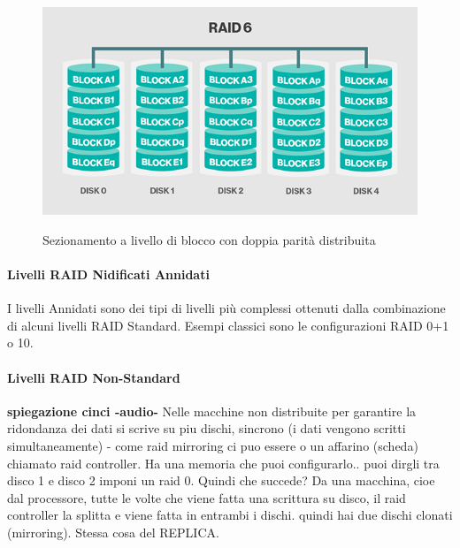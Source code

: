 \begin{itemize}
\begin{figure}[htbp]
\centering
\includegraphics[scale=0.40]{img/raid66.png}\\
\caption{Sezionamento a livello di blocco con doppia parit\`{a} distribuita\label{figura1.10} \cite{etichetta9}}
\end{figure}

\end{itemize}


\paragraph{Livelli RAID Nidificati Annidati}
I livelli Annidati sono dei tipi di livelli pi\`{u} complessi ottenuti dalla combinazione di alcuni livelli RAID Standard. Esempi classici sono le configurazioni RAID 0+1 o 10.

\paragraph{Livelli RAID Non-Standard}



\textbf{spiegazione cinci -audio-}
Nelle macchine non distribuite
per garantire la ridondanza dei dati si scrive su piu dischi, sincrono (i dati vengono scritti simultaneamente) - come raid mirroring
ci puo essere o un affarino (scheda) chiamato raid controller. Ha una memoria che puoi configurarlo.. puoi dirgli tra disco 1 e disco 2 imponi un raid 0. Quindi che succede? Da una macchina, cioe dal processore, tutte le volte che viene fatta una scrittura su disco, il raid controller la splitta e viene fatta in entrambi i dischi. quindi hai due dischi clonati (mirroring). Stessa cosa del REPLICA.

